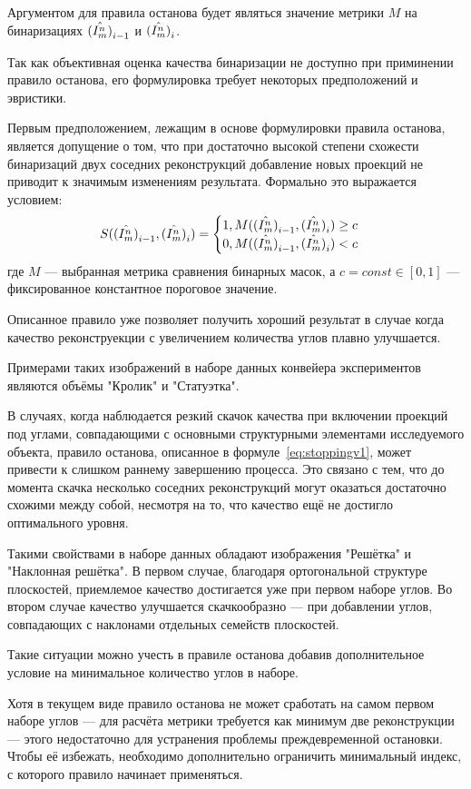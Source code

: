 Аргументом для правила останова будет являться значение метрики \(M\) на бинаризациях \(\hat{(I^n_m)} _{i-1}\) и \(\hat{(I^n_m)}_i\). 

Так как объективная оценка качества бинаризации не доступно при приминении правило останова, его формулировка требует некоторых предположений и эвристики.

Первым предположением, лежащим в основе формулировки правила останова, является допущение о том, что при достаточно высокой степени схожести бинаризаций двух соседних реконструкций добавление новых проекций не приводит к значимым изменениям результата. Формально это выражается условием:
\begin{equation} \label{eq:stoppingv1}
    S(\hat{(I^n_m)}_{i-1}, \hat{(I^n_m)}_{i}) = \begin{cases}
        1, M(\hat{(I^n_m)}_{i-1}, \hat{(I^n_m)}_i) \geq c\\
        0, M(\hat{(I^n_m)}_{i-1}, \hat{(I^n_m)}_i) < c

    \end{cases}
\end{equation}
где \(M\) — выбранная метрика сравнения бинарных масок, а \(c = const \in [0, 1]\) — фиксированное константное пороговое значение.

Описанное правило уже позволяет получить хороший результат в случае когда качество реконструекции с увеличением количества углов плавно улучшается.

Примерами таких изображений в наборе данных конвейера экспериментов являются объёмы "Кролик" и "Статуэтка".

В случаях, когда наблюдается резкий скачок качества при включении проекций под углами, совпадающими с основными структурными элементами исследуемого объекта, правило останова, описанное в формуле~\eqref{eq:stoppingv1}, может привести к слишком раннему завершению процесса. Это связано с тем, что до момента скачка несколько соседних реконструкций могут оказаться достаточно схожими между собой, несмотря на то, что качество ещё не достигло оптимального уровня.

Такими свойствами в наборе данных обладают изображения "Решётка" и "Наклонная решётка". В первом случае, благодаря ортогональной структуре плоскостей, приемлемое качество достигается уже при первом наборе углов. Во втором случае качество улучшается скачкообразно — при добавлении углов, совпадающих с наклонами отдельных семейств плоскостей.

Такие ситуации можно учесть в правиле останова добавив дополнительное условие на минимальное количество углов в наборе. 

Хотя в текущем виде правило останова не может сработать на самом первом наборе углов — для расчёта метрики требуется как минимум две реконструкции — этого недостаточно для устранения проблемы преждевременной остановки. Чтобы её избежать, необходимо дополнительно ограничить минимальный индекс, с которого правило начинает применяться.

